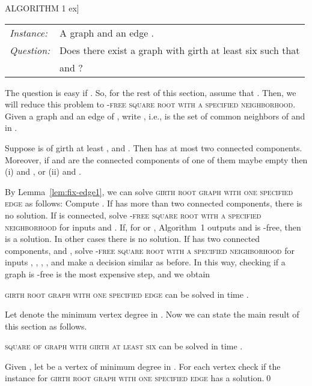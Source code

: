 \documentclass[proceedings]{stacs}
\newlength{\ai}
\begin{document}
\begin{center}
    ALGORITHM 1 \1ex]
\begin{tabular}{l l}
{\em Instance:}& A graph  and an edge .\\
{\em Question:}& Does there exist a graph  with girth at least six such that \\
               & and ?\\
\end{tabular}

The question is easy if .
So, for the rest of this section, assume that .
Then, we will reduce this problem to
\textsc{-free square root with a specified neighborhood}.
Given a graph  and an edge  of , write ,
i.e.,  is the set of common neighbors of  and  in .

\begin{lemma}\label{lem:fix-edge1}
Suppose  is of girth at least ,  and . Then
 has at most two connected components. Moreover, if  and  are the connected components of 
one of them maybe empty then (i)  and , or (ii)  and .
\end{lemma}



By Lemma~\ref{lem:fix-edge1}, we can solve \textsc{girth  root graph with one specified edge}
as follows: Compute . If  has more than two connected components, there is no solution.
If  is connected, solve
\textsc{-free square root with a specified neighborhood} for inputs  and . If, for  or , Algorithm~1 outputs 
and  is -free, then  is a solution. In other cases there is no solution. If 
has two connected components,  and , solve
\textsc{-free square root with a specified neighborhood} for inputs , , , , and make a decision
similar as before. In this way, checking if a graph is -free is the most expensive step,
and we obtain

\begin{theorem}\label{thm:fix-edge}
\textsc{girth  root graph with one specified edge} can be solved in time .
\end{theorem}


Let  denote the minimum vertex degree in . Now we can state the main result of this
section as follows.
\begin{theorem}\label{thm:girth6}
\textsc{square of graph with girth at least six} can be solved in time .
\end{theorem}
\proof Given , let  be a vertex of minimum degree in . For each vertex 
check if the instance  for \textsc{girth  root graph with one specified edge}
has a solution.\qed





\end{center}
\end{document}
